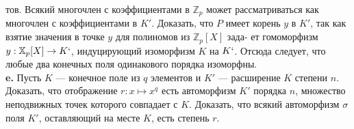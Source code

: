 тов. Всякий многочлен с коэффициентами в $\mathbb{Z}_p$ может рассматриваться\linebreak
как многочлен с коэффициентами в $K'$. Доказать, что $P$ имеет корень\linebreak
$y$ в $K'$, так как взятие значения в точке $y$ для полиномов из $\mathbb{Z}_p[X]$ зада-\linebreak
ет гомоморфизм $y:\mathbb{X}_p[X]\rightarrow K`$, индуцирующий изоморфизм $K$ на $K`$.
Отсюда следует, что любые два конечных поля одинакового порядка\linebreak
изоморфны.
\\
\hspace*{10pt}\textbf{e.} Пусть $K$ — конечное поле из $q$ элементов и $K'$ — расширение $K$\linebreak
степени $n$. Доказать, что отображение $r:x\mapsto x^q$ есть автоморфизм\linebreak
$K'$ порядка $n$, множество неподвижных точек которого совпадает с $K$.\linebreak
Доказать, что всякий автоморфизм $\sigma$ поля $K'$, оставляющий на месте\linebreak
$K$, есть степень $r$.
\pagebreak



